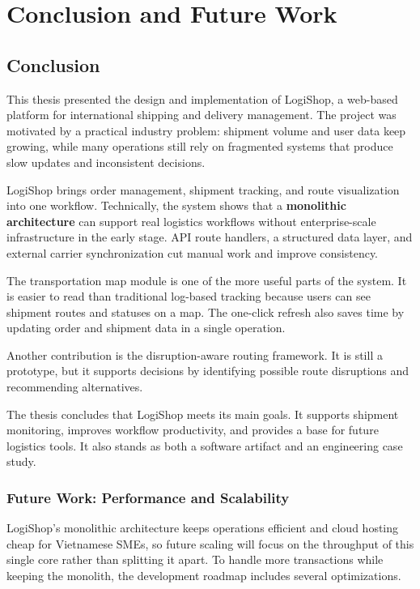 \chapter{Conclusion and Future Work}
\label{ch:conclusion-future-work}

\section{Conclusion}

This thesis presented the design and implementation of LogiShop, a web-based platform for international shipping and delivery management. The project was motivated by a practical industry problem: shipment volume and user data keep growing, while many operations still rely on fragmented systems that produce slow updates and inconsistent decisions.

LogiShop brings order management, shipment tracking, and route visualization into one workflow. Technically, the system shows that a \textbf{monolithic architecture} can support real logistics workflows without enterprise-scale infrastructure in the early stage. API route handlers, a structured data layer, and external carrier synchronization cut manual work and improve consistency.

The transportation map module is one of the more useful parts of the system. It is easier to read than traditional log-based tracking because users can see shipment routes and statuses on a map. The one-click refresh also saves time by updating order and shipment data in a single operation.

Another contribution is the disruption-aware routing framework. It is still a prototype, but it supports decisions by identifying possible route disruptions and recommending alternatives.

The thesis concludes that LogiShop meets its main goals. It supports shipment monitoring, improves workflow productivity, and provides a base for future logistics tools. It also stands as both a software artifact and an engineering case study.

\subsection{Future Work: Performance and Scalability}

LogiShop's monolithic architecture keeps operations efficient and cloud hosting cheap for Vietnamese SMEs, so future scaling will focus on the throughput of this single core rather than splitting it apart. To handle more transactions while keeping the monolith, the development roadmap includes several optimizations.

